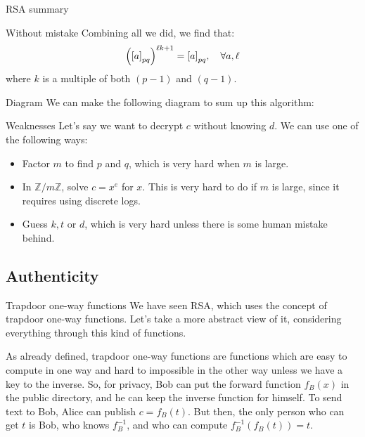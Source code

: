 \documentclass[a4paper]{article}
\begin{document}
\begin{parag}{RSA summary}
\begin{subparag}{Without mistake}
        Combining all we did, we find that: 
        \[\left(\left[a\right]_{pq}\right)^{\ell k + 1} = \left[a\right]_{pq}, \mathspace \forall a, \ell\]
        where $k$ is a multiple of both $\left(p-1\right)$ and $\left(q-1\right)$.
    \end{subparag}

    \begin{subparag}{Diagram}
        We can make the following diagram to sum up this algorithm:
    \end{subparag}
    
\end{parag}

\begin{parag}{Weaknesses}
    Let's say we want to decrypt $c$ without knowing $d$. We can use one of the following ways:
    \begin{itemize}
        \item Factor $m$ to find $p$ and $q$, which is very hard when $m$ is large.
        \item In $\mathbb{Z} / m\mathbb{Z}$, solve $c = x^e$ for $x$. This is very hard to do if $m$ is large, since it requires using discrete logs.
        \item Guess $k, t$ or $d$, which is very hard unless there is some human mistake behind.
    \end{itemize}
\end{parag}

\subsection{Authenticity}
\begin{parag}{Trapdoor one-way functions}
    We have seen RSA, which uses the concept of trapdoor one-way functions. Let's take a more abstract view of it, considering everything through this kind of functions.

    As already defined, trapdoor one-way functions are functions which are easy to compute in one way and hard to impossible in the other way unless we have a key to the inverse. So, for privacy, Bob can put the forward function $f_B\left(x\right)$ in the public directory, and he can keep the inverse function for himself. To send text to Bob, Alice can publish $c = f_B\left(t\right)$. But then, the only person who can get $t$ is Bob, who knows $f^{-1}_B$, and who can compute $f^{-1}_B\left(f_B\left(t\right)\right) = t$.
\end{parag}
\end{document}

